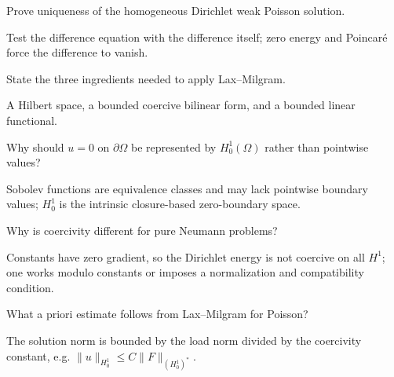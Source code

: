 \begin{problem}\label{prob:iii23-problem-04}
Prove uniqueness of the homogeneous Dirichlet weak Poisson solution.
\end{problem}
\begin{solution}
Test the difference equation with the difference itself; zero energy and
Poincaré force the difference to vanish.
\end{solution}

\begin{problem}\label{prob:iii23-problem-05}
State the three ingredients needed to apply Lax--Milgram.
\end{problem}
\begin{solution}
A Hilbert space, a bounded coercive bilinear form, and a bounded linear
functional.
\end{solution}

\begin{problem}\label{prob:iii23-problem-06}
Why should \(u=0\) on \(\partial\Omega\) be represented by \(H_0^1(\Omega)\) rather than pointwise values?
\end{problem}
\begin{solution}
Sobolev functions are equivalence classes and may lack pointwise boundary
values; \(H_0^1\) is the intrinsic closure-based zero-boundary space.
\end{solution}

\begin{problem}\label{prob:iii23-problem-07}
Why is coercivity different for pure Neumann problems?
\end{problem}
\begin{solution}
Constants have zero gradient, so the Dirichlet energy is not coercive on
all \(H^1\); one works modulo constants or imposes a normalization and
compatibility condition.
\end{solution}

\begin{problem}\label{prob:iii23-problem-08}
What a priori estimate follows from Lax--Milgram for Poisson?
\end{problem}
\begin{solution}
The solution norm is bounded by the load norm divided by the coercivity
constant, e.g. \(\|u\|_{H_0^1}\le C\|F\|_{(H_0^1)^*}\).
\end{solution}

